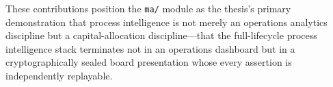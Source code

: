 These contributions position the \texttt{ma/} module as the thesis's primary demonstration
that process intelligence is not merely an operations analytics discipline but a
capital-allocation discipline---that the full-lifecycle process intelligence stack terminates
not in an operations dashboard but in a cryptographically sealed board presentation whose
every assertion is independently replayable.
